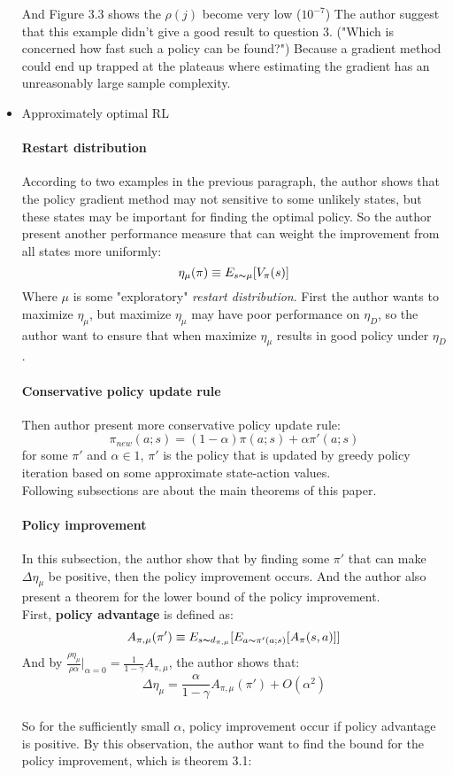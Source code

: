 \begin{itemize}
And Figure 3.3 shows the $\rho(j)$ become very low ($10^{-7}$) The author 
suggest that this example didn't give a good result to question 3. ("Which is 
concerned how fast such a policy can be found?") Because a gradient method could
end up trapped at the plateaus where estimating the gradient has an unreasonably
large sample complexity. \\

\newpage
\item Approximately optimal RL
\paragraph{Restart distribution \\}
According to two examples in the previous paragraph, the author shows that the policy gradient method may
not sensitive to some unlikely states, but these states may be important for finding the optimal policy.
So the author present another performance measure that can weight the improvement from all states more
uniformly:
\[\eta_{\mu}(\pi) \equiv E_{s{\thicksim}\mu} [V_{\pi}(s)]\]
Where $\mu$ is some "exploratory" \emph{restart distribution}. First the author wants to maximize $\eta_{\mu}$,
but maximize $\eta_{\mu}$ may have poor performance on $\eta_{D}$, so the author want to ensure that 
when maximize $\eta_{\mu}$ results in good policy under $\eta_{D}$. \\

\paragraph{Conservative policy update rule \\}
Then author present more conservative policy update rule:
\[\pi_{new}(a;s) = (1 - \alpha)\pi(a;s) + \alpha\pi'(a;s)\]
for some $\pi'$ and $\alpha \in 1$, $\pi'$ is the policy that is updated by greedy policy iteration based on 
some approximate state-action values. 
\\
Following subsections are about the main theorems of this paper. 

\paragraph{Policy improvement \\}
In this subsection, the author show that by finding some $\pi'$ that can make $\Delta \eta_{\mu}$ be positive, then the policy improvement occurs. And the author also present a theorem for the lower bound 
of the policy improvement.
\\
First, \textbf{policy advantage} is defined as:
\[A_{\pi,\mu}(\pi') \equiv E_{s{\thicksim}d_{\pi, \mu}} [E_{a{\thicksim}\pi'(a;s)} [A_{\pi}(s,a)]]\]
And by $\frac{\rho\eta_{\mu}}{\rho\alpha}|_{\alpha=0} = \frac{1}{1-\gamma}A_{\pi, \mu}$, the author shows that:
\[\Delta \eta_{\mu} = \frac{\alpha}{1 - \gamma}A_{\pi, \mu}(\pi') + O(\alpha^{2})\]
\\
So for the sufficiently small $\alpha$, policy improvement occur if policy advantage is positive.
By this observation, the author want to find the bound for the policy improvement, which is theorem 3.1:
\\

\end{itemize}
